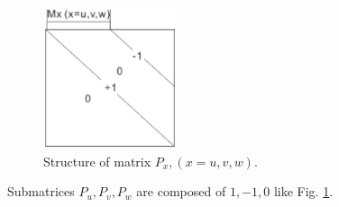 \begin{figure}[!ht]
\centering
\includegraphics[width=0.35\textwidth]{bilder/P_matrix}
\caption{Structure of matrix $P_{x},(x=u,v,w)$.}
\label{fig:Matrix Px}
\end{figure}
Submatrices $P_{u},P_{v},P_{w}$ are composed of $1,-1,0$ like Fig. \ref{fig:Matrix Px}.\\
 
